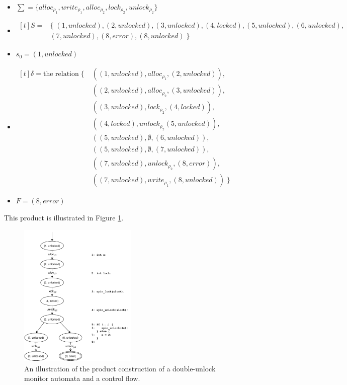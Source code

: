 \begin{itemize}
    \item{
        $ \sum = \{alloc_{\rho_1}, write_{\rho_1}, alloc_{\rho_2}, lock_{\rho_2}, unlock_{\rho_2}\} $
    }
    \item{
        $
            \begin{aligned}[t]
                S = & \{\;(1, unlocked), (2, unlocked), (3, unlocked), (4, locked), (5, unlocked), (6, unlocked),\\
                & (7, unlocked), (8, error), (8, unlocked) \; \}
            \end{aligned}
        $
    }
    \item $s_0 = (1, unlocked)$ 
    \item {
        $
            \begin{aligned}[t]
            \delta = \text{the relation} \; \{ \; & ((1, unlocked), alloc_{\rho_1}, (2, unlocked)), \\
            & ((2, unlocked), alloc_{\rho_2}, (3, unlocked)), \\
            & ((3, unlocked), lock_{\rho_2}, (4, locked)), \\
            & ((4, locked), unlock_{\rho_2} (5, unlocked)), \\
            & ((5, unlocked), \emptyset, (6, unlocked)), \\
            & ((5, unlocked), \emptyset, (7, unlocked)),\\
            & ((7, unlocked), unlock_{\rho_2}, (8, error)), \\
            & ((7, unlocked), write_{\rho_1}, (8, unlocked)) \; \}
            \end{aligned}
        $ 
    }
    \item $F = (8, error)$  
\end{itemize}

\noindent This product is illustrated in Figure \ref{cfg_unlock-product}. 

\begin{figure}[H]
    \centering
    \includegraphics[width=0.5\textwidth]{algorithm/figures/cfg_unlock-product}
    \caption{An illustration of the product construction of a double-unlock monitor automata and a control flow.}
    \label{cfg_unlock-product}
\end{figure}


